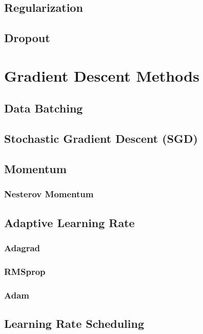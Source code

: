 \documentclass[12pt]{report}
\theoremstyle{definition}
\theoremstyle{remark}
\begin{document}
\subsection{Regularization}

\subsection{Dropout}

\section{Gradient Descent Methods}

\subsection{Data Batching}

\subsection{Stochastic Gradient Descent (SGD)}

\subsection{Momentum}

\subsubsection{Nesterov Momentum}

\subsection{Adaptive Learning Rate}

\subsubsection{Adagrad}

\subsubsection{RMSprop}

\subsubsection{Adam}

\subsection{Learning Rate Scheduling}
\end{document}
